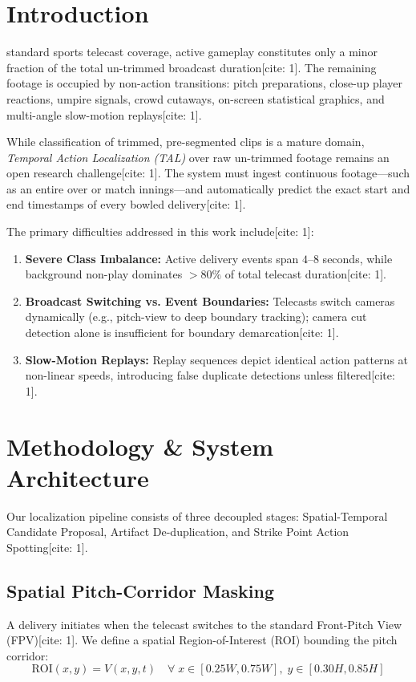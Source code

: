 ﻿\documentclass[10pt,journal,compsoc]{IEEEtran}
\begin{document}
\section{Introduction}
 standard sports telecast coverage, active gameplay constitutes only a minor fraction of the total un-trimmed broadcast duration[cite: 1]. The remaining footage is occupied by non-action transitions: pitch preparations, close-up player reactions, umpire signals, crowd cutaways, on-screen statistical graphics, and multi-angle slow-motion replays[cite: 1]. 

While classification of trimmed, pre-segmented clips is a mature domain, \textit{Temporal Action Localization (TAL)} over raw un-trimmed footage remains an open research challenge[cite: 1]. The system must ingest continuous footage---such as an entire over or match innings---and automatically predict the exact start and end timestamps of every bowled delivery[cite: 1].

The primary difficulties addressed in this work include[cite: 1]:
\begin{enumerate}
    \item \textbf{Severe Class Imbalance:} Active delivery events span $4\text{--}8$ seconds, while background non-play dominates $>80\%$ of total telecast duration[cite: 1].
    \item \textbf{Broadcast Switching vs. Event Boundaries:} Telecasts switch cameras dynamically (e.g., pitch-view to deep boundary tracking); camera cut detection alone is insufficient for boundary demarcation[cite: 1].
    \item \textbf{Slow-Motion Replays:} Replay sequences depict identical action patterns at non-linear speeds, introducing false duplicate detections unless filtered[cite: 1].
\end{enumerate}

\section{Methodology \& System Architecture}
Our localization pipeline consists of three decoupled stages: Spatial-Temporal Candidate Proposal, Artifact De-duplication, and Strike Point Action Spotting[cite: 1].

\subsection{Spatial Pitch-Corridor Masking}
A delivery initiates when the telecast switches to the standard Front-Pitch View (FPV)[cite: 1]. We define a spatial Region-of-Interest (ROI) bounding the pitch corridor:
\begin{equation}
\text{ROI}(x, y) = V(x, y, t) \quad \forall \; x \in [0.25W, 0.75W], \; y \in [0.30H, 0.85H]
\end{equation}
\end{document}
